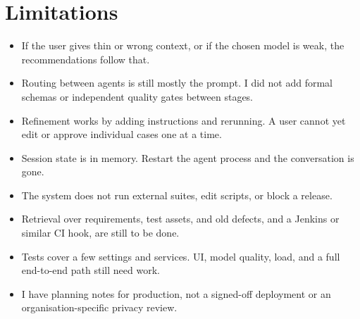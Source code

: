 \section{Limitations}
\begin{itemize}
  \item If the user gives thin or wrong context, or if the chosen model is weak, the recommendations follow that.
  \item Routing between agents is still mostly the prompt. I did not add formal schemas or independent quality gates between stages.
  \item Refinement works by adding instructions and rerunning. A user cannot yet edit or approve individual cases one at a time.
  \item Session state is in memory. Restart the agent process and the conversation is gone.
  \item The system does not run external suites, edit scripts, or block a release.
  \item Retrieval over requirements, test assets, and old defects, and a Jenkins or similar CI hook, are still to be done.
  \item Tests cover a few settings and services. UI, model quality, load, and a full end-to-end path still need work.
  \item I have planning notes for production, not a signed-off deployment or an organisation-specific privacy review.
\end{itemize}
